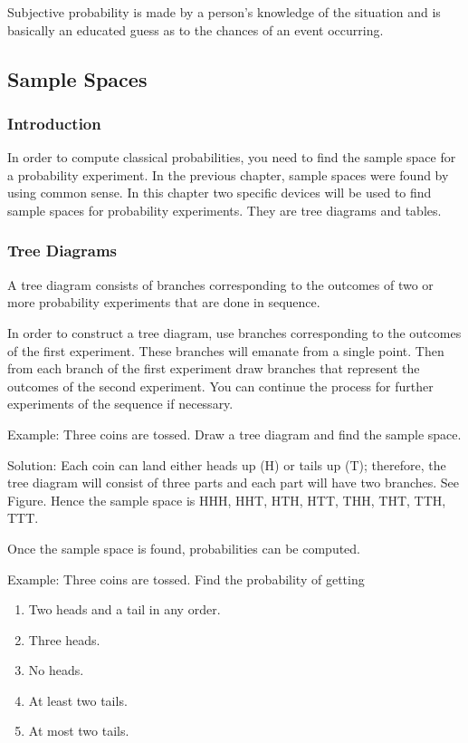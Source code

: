 Subjective probability is made by a person's knowledge of the situation and is basically an educated guess as to the chances of an event occurring.


\subsection{Sample Spaces}
\subsubsection{Introduction} 
In order to compute classical probabilities, you need to find the sample space for a probability experiment. In the previous chapter, sample spaces were found by using common sense. In this chapter two specific devices will be used to find sample spaces for probability experiments. They are tree diagrams and tables.


\subsubsection{Tree Diagrams}
A tree diagram consists of branches corresponding to the outcomes of two or more probability experiments that are done in sequence.

In order to construct a tree diagram, use branches corresponding to the outcomes of the first experiment. These branches will emanate from a single point. Then from each branch of the first experiment draw branches that represent the outcomes of the second experiment. You can continue the process for further experiments of the sequence if necessary.

Example: Three coins are tossed. Draw a tree diagram and find the sample space.

Solution: Each coin can land either heads up (H) or tails up (T); therefore, the tree diagram will consist of three parts and each part will have two branches. See Figure. Hence the sample space is HHH, HHT, HTH, HTT, THH, THT, TTH, TTT.

Once the sample space is found, probabilities can be computed. 

Example: Three coins are tossed. Find the probability of getting
\begin{enumerate}
\item Two heads and a tail in any order.
\item Three heads.
\item No heads.
\item At least two tails.
\item At most two tails.
\end{enumerate}

